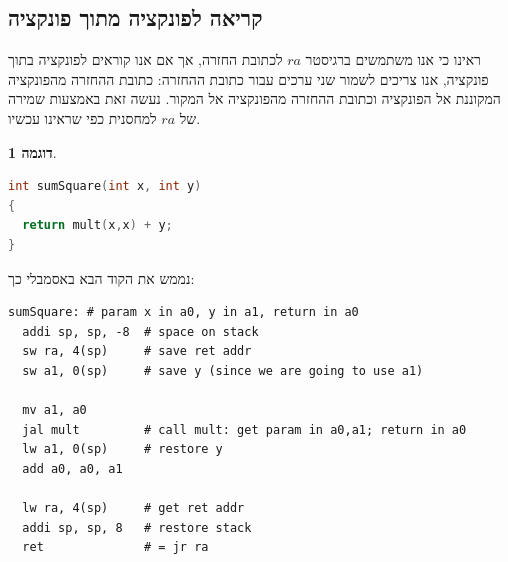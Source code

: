 \documentclass[12pt]{article}
\theoremstyle{plain}
\theoremstyle{definition}
\newtheorem{example}[theorem]{דוגמה}      %
\theoremstyle{remark}
\begin{document}
\subsection{קריאה לפונקציה מתוך פונקציה}
ראינו כי אנו משתמשים ברגיסטר \({ra}\) לכתובת החזרה, אך אם אנו קוראים לפונקציה בתוך פונקציה, אנו צריכים לשמור שני ערכים עבור כתובת ההחזרה: כתובת ההחזרה מהפונקציה המקוננת אל הפונקציה וכתובת ההחזרה מהפונקציה אל המקור.\newline{}
נעשה זאת באמצעות שמירה של \({ra}\) למחסנית כפי שראינו עכשיו.\begin{example}
\begin{LTR}\begin{lstlisting}[language=c]
int sumSquare(int x, int y)
{
  return mult(x,x) + y;
}

\end{lstlisting}\end{LTR}נממש את הקוד הבא באסמבלי כך:\begin{LTR}\begin{lstlisting}[language=assembly]
sumSquare: # param x in a0, y in a1, return in a0
  addi sp, sp, -8  # space on stack
  sw ra, 4(sp)     # save ret addr
  sw a1, 0(sp)     # save y (since we are going to use a1)
  
  mv a1, a0
  jal mult         # call mult: get param in a0,a1; return in a0
  lw a1, 0(sp)     # restore y
  add a0, a0, a1
  
  lw ra, 4(sp)     # get ret addr
  addi sp, sp, 8   # restore stack
  ret              # = jr ra

\end{lstlisting}\end{LTR}
\end{example}
\end{document}
